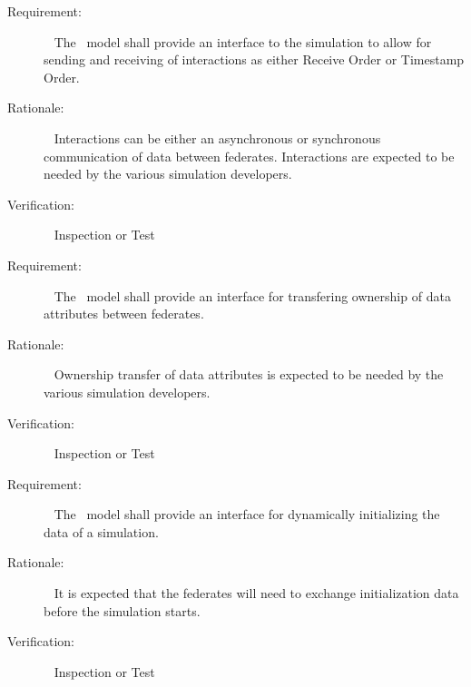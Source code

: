 \documentclass[twoside,11pt,titlepage]{report}
\begin{document}
\label{reqt:hla_interactions}
\begin{description}
  \item[Requirement:]\ \newline
    The \TrickHLA\ model shall provide an interface to the simulation
    to allow for sending and receiving of interactions as either
    Receive Order or Timestamp Order.

  \item[Rationale:]\ \newline
    Interactions can be either an asynchronous or synchronous
    communication of data between federates. Interactions are expected
    to be needed by the various simulation developers.

  \item[Verification:]\ \newline
    Inspection or Test
\end{description}


\label{reqt:hla_ownership_transfer}
\begin{description}
  \item[Requirement:]\ \newline
    The \TrickHLA\ model shall provide an interface for transfering
    ownership of data attributes between federates.

  \item[Rationale:]\ \newline
    Ownership transfer of data attributes is expected to be
    needed by the various simulation developers.

  \item[Verification:]\ \newline
    Inspection or Test
\end{description}


\label{reqt:dynamic_initialization}
\begin{description}
  \item[Requirement:]\ \newline
    The \TrickHLA\ model shall provide an interface for dynamically
    initializing the data of a simulation.

  \item[Rationale:]\ \newline
    It is expected that the federates will need to exchange initialization
    data before the simulation starts.

  \item[Verification:]\ \newline
    Inspection or Test
\end{description}
\end{document}
